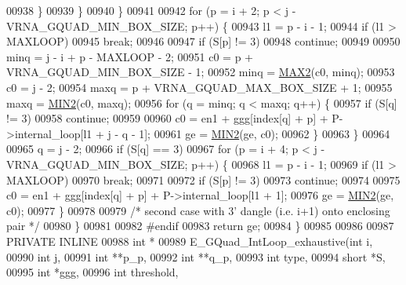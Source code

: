 \begin{DoxyCode}
00938         \}
00939       \}
00940     \}
00941 
00942     \textcolor{keywordflow}{for} (p = i + 2; p < j - VRNA\_GQUAD\_MIN\_BOX\_SIZE; p++) \{
00943       l1 = p - i - 1;
00944       \textcolor{keywordflow}{if} (l1 > MAXLOOP)
00945         \textcolor{keywordflow}{break};
00946 
00947       \textcolor{keywordflow}{if} (S[p] != 3)
00948         \textcolor{keywordflow}{continue};
00949 
00950       minq  = j - i + p - MAXLOOP - 2;
00951       c0    = p + VRNA\_GQUAD\_MIN\_BOX\_SIZE - 1;
00952       minq  = \hyperlink{group__utils_ga33297b3679c713b0c4d897cd0fe3b122}{MAX2}(c0, minq);
00953       c0    = j - 2;
00954       maxq  = p + VRNA\_GQUAD\_MAX\_BOX\_SIZE + 1;
00955       maxq  = \hyperlink{group__utils_gae0b9cd0ce090bd69b951aa73e8fa4f7d}{MIN2}(c0, maxq);
00956       \textcolor{keywordflow}{for} (q = minq; q < maxq; q++) \{
00957         \textcolor{keywordflow}{if} (S[q] != 3)
00958           \textcolor{keywordflow}{continue};
00959 
00960         c0  = en1 + ggg[index[q] + p] + P->internal\_loop[l1 + j - q - 1];
00961         ge  = \hyperlink{group__utils_gae0b9cd0ce090bd69b951aa73e8fa4f7d}{MIN2}(ge, c0);
00962       \}
00963     \}
00964 
00965     q = j - 2;
00966     \textcolor{keywordflow}{if} (S[q] == 3)
00967       \textcolor{keywordflow}{for} (p = i + 4; p < j - VRNA\_GQUAD\_MIN\_BOX\_SIZE; p++) \{
00968         l1 = p - i - 1;
00969         \textcolor{keywordflow}{if} (l1 > MAXLOOP)
00970           \textcolor{keywordflow}{break};
00971 
00972         \textcolor{keywordflow}{if} (S[p] != 3)
00973           \textcolor{keywordflow}{continue};
00974 
00975         c0  = en1 + ggg[index[q] + p] + P->internal\_loop[l1 + 1];
00976         ge  = \hyperlink{group__utils_gae0b9cd0ce090bd69b951aa73e8fa4f7d}{MIN2}(ge, c0);
00977       \}
00978 
00979     \textcolor{comment}{/* second case with 3' dangle (i.e. i+1) onto enclosing pair */}
00980   \}
00981 
00982 \textcolor{preprocessor}{#endif}
00983   \textcolor{keywordflow}{return} ge;
00984 \}
00985 
00986 
00987 PRIVATE INLINE
00988 \textcolor{keywordtype}{int} *
00989 E\_GQuad\_IntLoop\_exhaustive(\textcolor{keywordtype}{int}          i,
00990                            \textcolor{keywordtype}{int}          j,
00991                            \textcolor{keywordtype}{int}          **p\_p,
00992                            \textcolor{keywordtype}{int}          **q\_p,
00993                            \textcolor{keywordtype}{int}          type,
00994                            \textcolor{keywordtype}{short}        *S,
00995                            \textcolor{keywordtype}{int}          *ggg,
00996                            \textcolor{keywordtype}{int}          threshold,

\end{DoxyCode}
